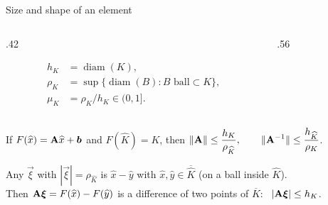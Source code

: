 \begin{frame}{Size and shape of an element}
    \begin{columns}[c,onlytextwidth]
        \begin{column}{.42\textwidth}
            \begin{definition}
                \vspace{-\abovedisplayskip}
                \begin{align*}
                    h_K    & = \operatorname{diam}(K),                                    \\
                    \rho_K & = \sup\{\operatorname{diam}(B) : B \text{ ball} \subset K\}, \\
                    \mu_K  & = \rho_K / h_K \in (0,1].
                \end{align*}
            \end{definition}
        \end{column}
        \begin{column}{.56\textwidth}
            \centering
        \end{column}
    \end{columns}
    \begin{lemma}
        If $F(\widehat x) = \mathbf{A}\widehat x + \bm{b}$ and $F(\widehat K) = K$, then
        \quad $\displaystyle \|\mathbf{A}\| \le \frac{h_K}{\rho_{\widehat K}}, \qquad \|\mathbf{A}^{-1}\| \le \frac{h_{\widehat K}}{\rho_K}$.
    \end{lemma}
    \begin{proofsteps}[Proof]
        Any $\vec\xi$ with $|\vec\xi| = \rho_{\widehat K}$ is $\widehat x - \widehat y$ with $\widehat x, \widehat y \in \overline{\widehat K}$ (on a ball inside $\widehat K$).\\
        Then $\mathbf{A}\bm{\xi} = F(\widehat x) - F(\widehat y)$ is a difference of two points of $\overline K$: \ $|\mathbf{A} \bm{\xi}| \le h_K$.
    \end{proofsteps}
\end{frame}

